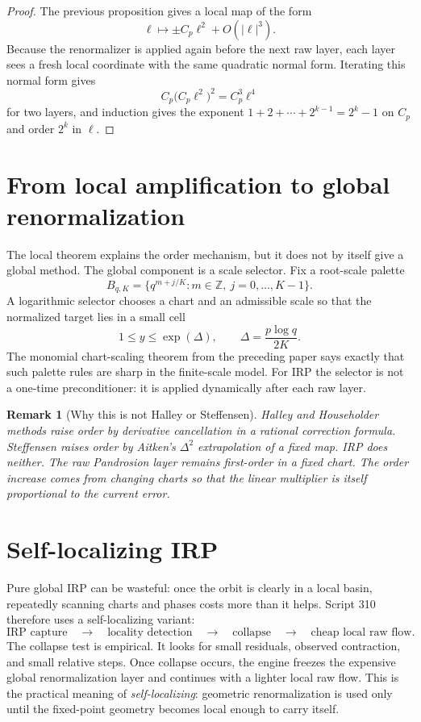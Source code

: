 \documentclass[11pt]{article}
\newtheorem{remark}{Remark}
\begin{document}
\begin{proof}
The previous proposition gives a local map of the form
\[
  \ell\mapsto \pm C_p\ell^2+O(|\ell|^3).
\]
Because the renormalizer is applied again before the next raw layer, each layer sees a fresh local coordinate with the same quadratic normal form.  Iterating this normal form gives
\[
  C_p\bigl(C_p\ell^2\bigr)^2=C_p^3\ell^4
\]
for two layers, and induction gives the exponent $1+2+\cdots+2^{k-1}=2^k-1$ on $C_p$ and order $2^k$ in $\ell$.
\end{proof}

\section{From local amplification to global renormalization}
The local theorem explains the order mechanism, but it does not by itself give a global method.  The global component is a scale selector.  Fix a root-scale palette
\[
  B_{q,K}=\{q^{m+j/K}:m\in\mathbb Z,
  \ j=0,\ldots,K-1\}.
\]
A logarithmic selector chooses a chart and an admissible scale so that the normalized target lies in a small cell
\begin{equation}
  1\leq y\leq \exp(\Delta),\qquad \Delta=\frac{p\log q}{2K}. \label{eq:cell}
\end{equation}
The monomial chart-scaling theorem from the preceding paper says exactly that such palette rules are sharp in the finite-scale model.  For IRP the selector is not a one-time preconditioner: it is applied dynamically after each raw layer.

\begin{remark}[Why this is not Halley or Steffensen]
Halley and Householder methods raise order by derivative cancellation in a rational correction formula.  Steffensen raises order by Aitken's $\Delta^2$ extrapolation of a fixed map.  IRP does neither.  The raw Pandrosion layer remains first-order in a fixed chart.  The order increase comes from changing charts so that the linear multiplier is itself proportional to the current error.
\end{remark}

\section{Self-localizing IRP}
Pure global IRP can be wasteful: once the orbit is clearly in a local basin, repeatedly scanning charts and phases costs more than it helps.  Script 310 therefore uses a self-localizing variant:
\[
  \text{IRP capture}\quad\longrightarrow\quad
  \text{locality detection}\quad\longrightarrow\quad
  \text{collapse}\quad\longrightarrow\quad
  \text{cheap local raw flow}.
\]
The collapse test is empirical.  It looks for small residuals, observed contraction, and small relative steps.  Once collapse occurs, the engine freezes the expensive global renormalization layer and continues with a lighter local raw flow.  This is the practical meaning of \emph{self-localizing}: geometric renormalization is used only until the fixed-point geometry becomes local enough to carry itself.
\end{document}
